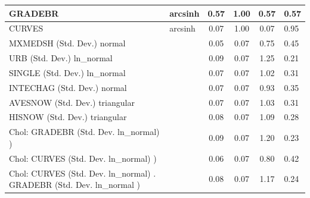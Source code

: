\begin{table}
\begin{center}
\begin{tabular}{|l|l|c|c|c|l|}
			\hline
			GRADEBR & arcsinh & 0.57 & 1.00 & 0.57 & 0.57 \\
			\hline
			CURVES & arcsinh & 0.07 & 1.00 & 0.07 & 0.95 \\
			\hline
			MXMEDSH (Std. Dev.) normal &  & 0.05 & 0.07 & 0.75 & 0.45 \\
			\hline
			URB (Std. Dev.) ln_normal &  & 0.09 & 0.07 & 1.25 & 0.21 \\
			\hline
			SINGLE (Std. Dev.) ln_normal &  & 0.07 & 0.07 & 1.02 & 0.31 \\
			\hline
			INTECHAG (Std. Dev.) normal &  & 0.07 & 0.07 & 0.93 & 0.35 \\
			\hline
			AVESNOW (Std. Dev.) triangular &  & 0.07 & 0.07 & 1.03 & 0.31 \\
			\hline
			HISNOW (Std. Dev.) triangular &  & 0.08 & 0.07 & 1.09 & 0.28 \\
			\hline
			 Chol: GRADEBR (Std. Dev. ln_normal) ) &  & 0.09 & 0.07 & 1.20 & 0.23 \\
			\hline
			 Chol: CURVES (Std. Dev. ln_normal) ) &  & 0.06 & 0.07 & 0.80 & 0.42 \\
			\hline
			 Chol: CURVES (Std. Dev. ln_normal) . GRADEBR (Std. Dev.   ln_normal ) &  & 0.08 & 0.07 & 1.17 & 0.24 \\
			\hline
		\end{tabular}
	\end{center}
\end{table}